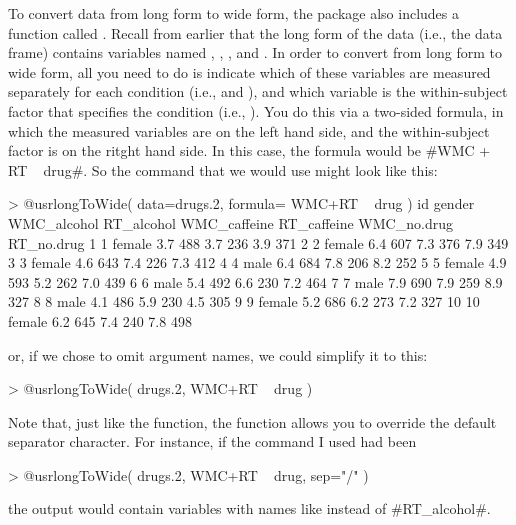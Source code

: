 To convert data from long form to wide form, the  package also includes a function called . Recall from earlier that the long form of the data (i.e., the  data frame) contains variables named , , ,  and . In order to convert from long form to wide form, all you need to do is indicate which of these variables are measured separately for each condition (i.e.,  and ), and which variable is the within-subject factor that specifies the condition (i.e., ). You do this via a two-sided formula, in which the measured variables are on the left hand side, and the within-subject factor is on the ritght hand side. In this case, the formula would be \rtextverb#WMC + RT ~ drug#. So the command that we would use might look like this: 
\begin{rblock1}
> @usr{longToWide( data=drugs.2, formula= WMC+RT ~ drug )}
   id gender WMC_alcohol RT_alcohol WMC_caffeine RT_caffeine WMC_no.drug RT_no.drug
1   1 female         3.7        488          3.7         236         3.9        371
2   2 female         6.4        607          7.3         376         7.9        349
3   3 female         4.6        643          7.4         226         7.3        412
4   4   male         6.4        684          7.8         206         8.2        252
5   5 female         4.9        593          5.2         262         7.0        439
6   6   male         5.4        492          6.6         230         7.2        464
7   7   male         7.9        690          7.9         259         8.9        327
8   8   male         4.1        486          5.9         230         4.5        305
9   9 female         5.2        686          6.2         273         7.2        327
10 10 female         6.2        645          7.4         240         7.8        498
\end{rblock1}
or, if we chose to omit argument names, we could simplify it to this:
\begin{rblock1}
> @usr{longToWide( drugs.2, WMC+RT ~ drug )}
\end{rblock1}
Note that, just like the  function, the  function allows you to override the default separator character. For instance, if the command I used had been 
\begin{rblock1}
> @usr{longToWide( drugs.2, WMC+RT ~ drug, sep="/" )}
\end{rblock1}
the output would contain variables with names like  instead of \rtextverb#RT_alcohol#.

